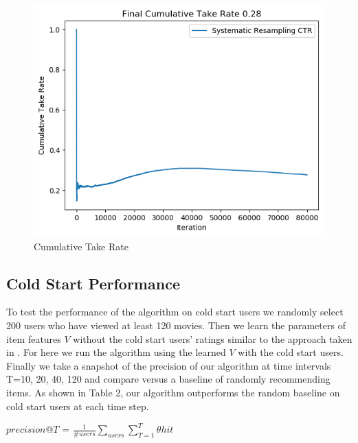 \documentclass{article}
\begin{document}
\begin{figure}[ht]
\begin{center}
\centerline{\includegraphics[width=\columnwidth]{CTR}}
\caption{Cumulative Take Rate}
\label{MSEResampling}
\end{center}
\vskip -0.4in
\end{figure}


\subsection{Cold Start Performance}
To test the performance of the algorithm on cold start users we randomly select 200 users who have viewed at least 120 movies. Then we learn the parameters of item features $V$ without the cold start users’ ratings similar to the approach taken in \cite{zhao2013interactive}. For here we run the algorithm using the learned $V$ with the cold start users. Finally we take a snapshot of the precision of our algorithm at time intervals T=10, 20, 40, 120 and compare versus a baseline of randomly recommending items. As shown in Table 2, our algorithm outperforms the random baseline on cold start users at each time step.

\begin{center}
$precision@T$ = $\frac{1}{\#users}\sum\limits_{users}\sum\limits_{T=1}^{T}\theta hit$
\end{center}
\end{document}

